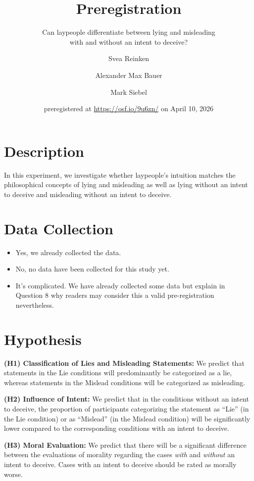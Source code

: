 \documentclass[scrarticle]{scrartcl}
\title{Preregistration}
\subtitle{Can laypeople differentiate between lying and misleading\\with and without an intent to deceive?}
\author[1]{Svea Reinken}
\author[1]{Alexander Max Bauer}
\author[1]{Mark Siebel}
\affil[1]{ Carl von Ossietzky University of Oldenburg}
\date{\small preregistered at \url{https://osf.io/9u6zn/} on April 10, 2026}
\begin{document}
\maketitle


\clearpage
\section{Description}
In this experiment, we investigate whether laypeople's intuition matches the philosophical concepts of lying and misleading as well as lying without an intent to deceive and misleading without an intent to deceive.


\section{Data Collection}
\begin{itemize}[label=\Square,noitemsep]
   \item Yes, we already collected the data.
   \item[\XBox] No, no data have been collected for this study yet.
   \item It's complicated. We have already collected some data but explain in Question $8$ why readers may consider this a valid pre-registration nevertheless.
\end{itemize}


\section{Hypothesis}
\noindent \textsf{\textbf{(H1) Classification of Lies and Misleading Statements:}}
We predict that statements in the Lie conditions will predominantly be categorized as a lie, whereas statements in the Mislead conditions will be categorized as misleading.

\vspace{0.75em}
\noindent \textsf{\textbf{(H2) Influence of  Intent:}}
We predict that in the conditions without an intent to deceive, the proportion of participants categorizing the statement as \enquote{Lie} (in the Lie condition) or as \enquote{Mislead} (in the Mislead condition) will be significantly lower compared to the corresponding conditions with an intent to deceive.

\vspace{0.75em}
\noindent \textsf{\textbf{(H3) Moral Evaluation:}}
We predict that there will be a significant difference between the evaluations of morality regarding the cases \textit{with} and \textit{without} an intent to deceive.
Cases with an intent to deceive should be rated as morally worse.
\end{document}
